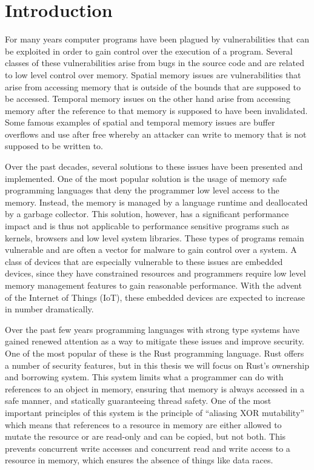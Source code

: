 \chapter{Introduction}
\label{cha:intro}
For many years computer programs have been plagued by vulnerabilities that can be exploited in order to gain control over the execution of a program.
Several classes of these vulnerabilities arise from bugs in the source code and are related to low level control over memory.
Spatial memory issues are vulnerabilities that arise from accessing memory that is outside of the bounds that are supposed to be accessed.
Temporal memory issues on the other hand arise from accessing memory after the reference to that memory is supposed to have been invalidated.
Some famous examples of spatial and temporal memory issues are buffer overflows and use after free whereby an attacker can write to memory that is not supposed to be written to.

Over the past decades, several solutions to these issues have been presented and implemented.
One of the most popular solution is the usage of memory safe programming languages that deny the programmer low level access to the memory.
Instead, the memory is managed by a language runtime and deallocated by a garbage collector.
This solution, however, has a significant performance impact and is thus not applicable to performance sensitive programs such as kernels, browsers and low level system libraries.
These types of programs remain vulnerable and are often a vector for malware to gain control over a system.
A class of devices that are especially vulnerable to these issues are embedded devices, since they have constrained resources and programmers require low level memory management features to gain reasonable performance.
With the advent of the Internet of Things (IoT), these embedded devices are expected to increase in number dramatically.

Over the past few years programming languages with strong type systems have gained renewed attention as a way to mitigate these issues and improve security.
One of the most popular of these is the Rust programming language.
Rust offers a number of security features, but in this thesis we will focus on Rust's ownership and borrowing system.
This system limits what a programmer can do with references to an object in memory, ensuring that memory is always accessed in a safe manner, and statically guaranteeing thread safety.
One of the most important principles of this system is the principle of ``aliasing XOR mutability'' which means that references to a resource in memory are either allowed to mutate the resource or are read-only and can be copied, but not both.
This prevents concurrent write accesses and concurrent read and write access to a resource in memory, which ensures the absence of things like data races.

